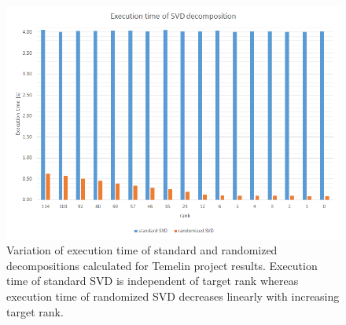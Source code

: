 \begin{figure}[ht]
\centering\includegraphics[width=\textwidth]{figures/temelin_ExecutionTime}
\caption{Variation of execution time of standard and randomized decompositions calculated for Temelin project results. Execution time of standard SVD is independent of target rank whereas execution time of randomized SVD decreases linearly with increasing target rank.}
\label{fig:temelin:ExeTime}
\end{figure}

